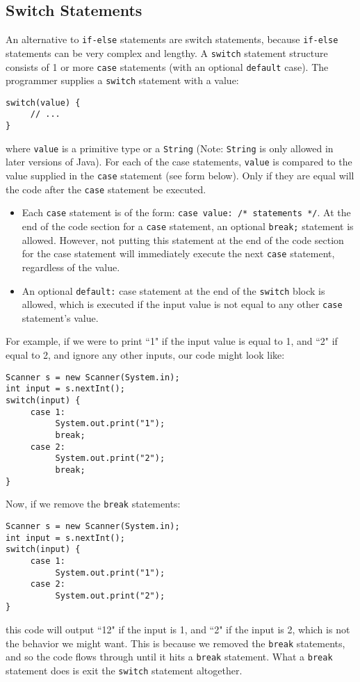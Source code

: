 \subsection{Switch Statements}
An alternative to \verb|if-else| statements are switch statements, because \verb|if-else| statements can be very complex and lengthy. A \verb|switch| statement structure consists of 1 or more \verb|case| statements (with an optional \verb|default| case). The programmer supplies a \verb|switch| statement with a value:
\begin{lstlisting}
switch(value) {
     // ...
}
\end{lstlisting}
where \verb|value| is a primitive type or a \verb|String| (Note: \verb|String| is only allowed in later versions of Java). For each of the case statements, \verb|value| is compared to the value supplied in the \verb|case| statement (see form below). Only if they are equal will the code after the \verb|case| statement be executed.
\begin{itemize}
\item Each \verb|case| statement is of the form: \verb|case value: /* statements */|. At the end of the code section for a \verb|case| statement, an optional \verb|break;| statement is allowed. However, not putting this statement at the end of the code section for the case statement will immediately execute the next \verb|case| statement, regardless of the value.
\item An optional \verb|default:| case statement at the end of the \verb|switch| block is allowed, which is executed if the input value is not equal to any other \verb|case| statement's value.
\end{itemize}
For example, if we were to print ``1" if the input value is equal to 1, and ``2" if equal to 2, and ignore any other inputs, our code might look like:
\begin{lstlisting}
Scanner s = new Scanner(System.in);
int input = s.nextInt();
switch(input) {
     case 1:
          System.out.print("1");
          break;
     case 2:
          System.out.print("2");
          break;
}
\end{lstlisting}
Now, if we remove the \verb|break| statements:
\begin{lstlisting}
Scanner s = new Scanner(System.in);
int input = s.nextInt();
switch(input) {
     case 1:
          System.out.print("1");
     case 2:
          System.out.print("2");
}
\end{lstlisting}
this code will output ``12" if the input is 1, and ``2" if the input is 2, which is not the behavior we might want. This is because we removed the \verb|break| statements, and so the code flows through until it hits a \verb|break| statement. What a \verb|break| statement does is exit the \verb|switch| statement altogether.
